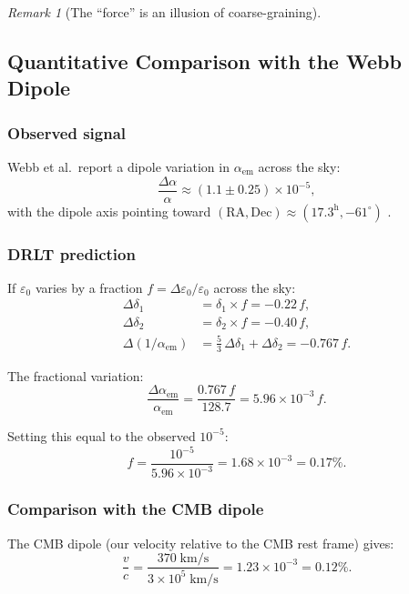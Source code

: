 \documentclass[12pt]{article}
\theoremstyle{remark}
\newtheorem{remark}[theorem]{Remark}
\theoremstyle{definition}
\begin{document}
\begin{remark}[The ``force'' is an illusion of coarse-graining]
\subsection{Quantitative Comparison with the Webb Dipole}

\subsubsection{Observed signal}

Webb et al.\ report a dipole variation in $\alpha_\text{em}$ across the sky:
\begin{equation}
\frac{\Delta\alpha}{\alpha} \approx (1.1 \pm 0.25) \times 10^{-5},
\end{equation}
with the dipole axis pointing toward $(\text{RA}, \text{Dec}) \approx (17.3^\text{h}, -61^\circ)$ \cite{Webb}.

\subsubsection{DRLT prediction}

If $\varepsilon_0$ varies by a fraction $f = \Delta\varepsilon_0/\varepsilon_0$ across the sky:
\begin{align}
\Delta\delta_1 &= \delta_1 \times f = -0.22\,f, \\
\Delta\delta_2 &= \delta_2 \times f = -0.40\,f, \\
\Delta(1/\alpha_\text{em}) &= \tfrac{5}{3}\,\Delta\delta_1 + \Delta\delta_2 = -0.767\,f.
\end{align}

The fractional variation:
\begin{equation}
\frac{\Delta\alpha_\text{em}}{\alpha_\text{em}} = \frac{0.767\,f}{128.7} = 5.96 \times 10^{-3}\,f.
\end{equation}

Setting this equal to the observed $10^{-5}$:
\begin{equation}
\boxed{f = \frac{10^{-5}}{5.96 \times 10^{-3}} = 1.68 \times 10^{-3} = 0.17\%.}
\end{equation}

\subsubsection{Comparison with the CMB dipole}

The CMB dipole (our velocity relative to the CMB rest frame) gives:
\begin{equation}
\frac{v}{c} = \frac{370\;\text{km/s}}{3 \times 10^5\;\text{km/s}} = 1.23 \times 10^{-3} = 0.12\%.
\end{equation}


\end{remark}
\end{document}
